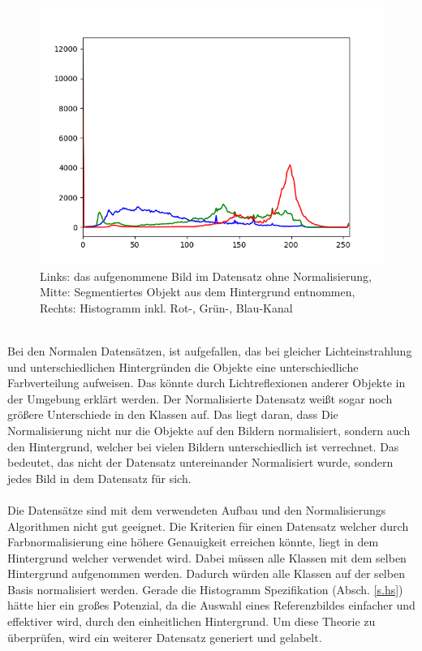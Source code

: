 \documentclass[a4paper,12pt,oneside]{article}
\begin{document}
\begin{figure}[htb]
\begin{minipage}[c]{0.08\textwidth}
\end{minipage}
\hfill
\begin{minipage}[c]{0.3\textwidth}
\includegraphics[width=\textwidth]{Sources/image105_Histogramm.png}
\end{minipage}
\caption{Links: das aufgenommene Bild im Datensatz ohne Normalisierung, Mitte: Segmentiertes Objekt aus dem Hintergrund entnommen, Rechts: Histogramm inkl. Rot-, Grün-, Blau-Kanal}
\end{figure}\\
Bei den Normalen Datensätzen, ist aufgefallen, das bei gleicher Lichteinstrahlung und unterschiedlichen Hintergründen die Objekte eine unterschiedliche Farbverteilung aufweisen. Das könnte durch Lichtreflexionen anderer Objekte in der Umgebung erklärt werden. Der Normalisierte Datensatz weißt sogar noch größere Unterschiede in den Klassen auf. Das liegt daran, dass Die Normalisierung nicht nur die Objekte auf den Bildern normalisiert, sondern auch den Hintergrund, welcher bei vielen Bildern unterschiedlich ist verrechnet. Das bedeutet, das nicht der Datensatz untereinander Normalisiert wurde, sondern jedes Bild in dem Datensatz für sich.\\\\
Die Datensätze sind mit dem verwendeten Aufbau und den Normalisierungs Algorithmen nicht gut geeignet. Die Kriterien für einen Datensatz welcher durch Farbnormalisierung eine höhere Genauigkeit erreichen könnte, liegt in dem Hintergrund welcher verwendet wird. Dabei müssen alle Klassen mit dem selben Hintergrund aufgenommen werden. Dadurch würden alle Klassen auf der selben Basis    normalisiert werden. Gerade die Histogramm Spezifikation (Absch. \ref{s.hs}) hätte hier ein großes Potenzial, da die Auswahl eines Referenzbildes einfacher und effektiver wird, durch den einheitlichen Hintergrund. Um diese Theorie zu überprüfen, wird ein weiterer Datensatz generiert und gelabelt. 
  \newpage
\end{document}
